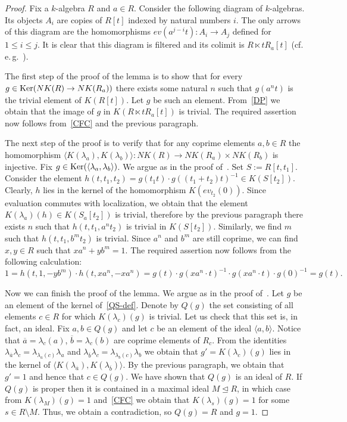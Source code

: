 \documentclass[oneside, 11pt]{amsart} \pdfoutput=1
\begin{document}
\begin{proof}
 Fix a $k$-algebra $R$ and $a \in R$. 
 Consider the following diagram of $k$-algebras. Its objects $A_i$ are copies of $R[t]$ indexed by natural numbers $i$. The only arrows of this diagram are the homomorphisms $ev (a^{j-i}t)\colon A_i \to A_j$ defined for $1 \leq i \leq j$. It is clear that this diagram is filtered and its colimit is $R \ltimes tR_a[t]$ (cf. e.\,g.~\cite[Lemma~15]{S15}). 
 
 The first step of the proof of the lemma is to show that for every $g \in \mathop{\mathrm{Ker}}\nolimits(NK(R) \to NK(R_a))$ there exists some natural $n$ such that $g(a^nt)$ is the trivial element of $K(R[t])$. Let $g$ be such an element. From~\ref{DP} we obtain that the image of $g$ in $K(R \ltimes tR_a[t])$ is trivial. The required assertion now follows from~\ref{CFC} and the previous paragraph.
 
 The next step of the proof is to verify that for any coprime elements $a, b \in R$ the homomorphism $\langle K(\lambda_a), K(\lambda_b) \rangle \colon NK(R) \to NK(R_a) \times NK(R_b)$ is injective. Fix $g \in \mathop{\mathrm{Ker}}\nolimits(\langle \lambda_a, \lambda_b \rangle)$. We argue as in the proof of~\cite[Lemma~2.5]{Tu83}. Set $S := R[t, t_1]$. Consider the element $h(t, t_1, t_2) = g(t_1 t) \cdot g((t_1 + t_2)t)^{-1}\in K(S[t_2]).$ Clearly, $h$ lies in the kernel of the homomorphism $K(ev_{t_2}(0))$. Since evaluation commutes with localization, we obtain that the element $K(\lambda_a)(h) \in K(S_a[t_2])$ is trivial, therefore by the previous paragraph there exists $n$ such that $h(t, t_1, a^nt_2)$ is trivial in $K(S[t_2])$. Similarly, we find $m$ such that $h(t, t_1, b^m t_2)$ is trivial. Since $a^n$ and $b^m$ are still coprime, we can find $x, y \in R$ such that $xa^n + yb^m = 1$. The required assertion now follows from the following calculation:
 $$1 = h(t, 1, -yb^m) \cdot h(t, xa^n, -xa^n) = g(t)\cdot g(xa^n\cdot t)^{-1} \cdot g(xa^n\cdot t) \cdot g(0)^{-1} = g(t).$$
 
 Now we can finish the proof of the lemma. We argue as in the proof of~\cite[Theorem~2]{S15}. Let $g$ be an element of the kernel of~\eqref{QS-def}. Denote by $Q(g)$ the set consisting of all elements $c \in R$ for which $K(\lambda_c)(g)$ is trivial. Let us check that this set is, in fact, an ideal. Fix $a, b \in Q(g)$ and let $c$ be an element of the ideal $\langle a, b \rangle$. Notice that $\overline{a} = \lambda_c(a)$, $\overline{b} = \lambda_c(b)$ are coprime elements of $R_c$. From the identities $\lambda_{\overline{a}}\lambda_c = \lambda_{\lambda_a(c)}\lambda_a$ and $\lambda_{\overline{b}}\lambda_c = \lambda_{\lambda_b(c)}\lambda_b$ we obtain that $g' = K(\lambda_c)(g)$ lies in the kernel of $\langle K(\lambda_{\overline{a}}), K(\lambda_{\overline{b}}) \rangle.$ By the previous paragraph, we obtain that $g' = 1$ and hence that $c \in Q(g)$. We have shown that $Q(g)$ is an ideal of $R$. If $Q(g)$ is proper then it is contained in a maximal ideal $M \trianglelefteq R$, in which case from $K(\lambda_M)(g) = 1$ and~\ref{CFC} we obtain that $K(\lambda_s)(g) = 1$ for some $s \in R \setminus M$. Thus, we obtain a contradiction, so $Q(g) = R$ and $g = 1$.
\end{proof}
\end{document}
